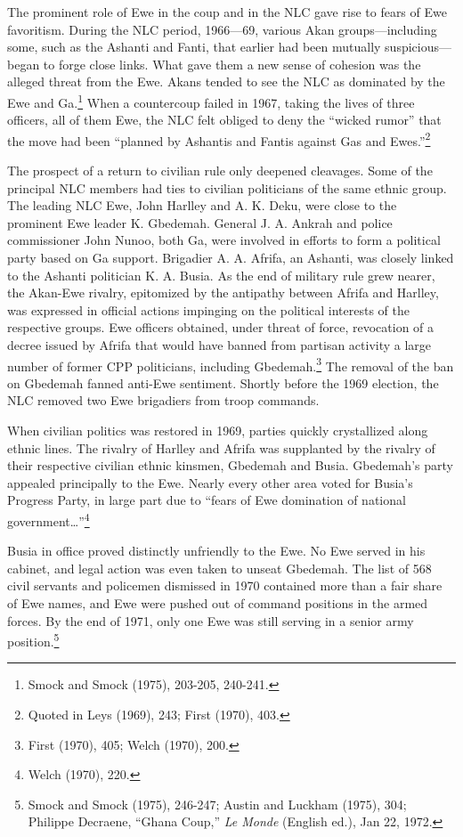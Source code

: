 \documentclass[
  letterpaper,
  DIV=11,
  numbers=noendperiod]{scrartcl}
\begin{document}
The prominent role of Ewe in the coup and in the NLC gave rise to fears
of Ewe favoritism. During the NLC period, 1966---69, various Akan
groups---including some, such as the Ashanti and Fanti, that earlier had
been mutually suspicious---began to forge close links. What gave them a
new sense of cohesion was the alleged threat from the Ewe. Akans tended
to see the NLC as dominated by the Ewe and Ga.\footnote{Smock and Smock
  (1975), 203-205, 240-241.} When a countercoup failed in 1967, taking
the lives of three officers, all of them Ewe, the NLC felt obliged to
deny the ``wicked rumor'' that the move had been ``planned by Ashantis
and Fantis against Gas and Ewes.''\footnote{Quoted in Leys (1969), 243;
  First (1970), 403.}

The prospect of a return to civilian rule only deepened cleavages. Some
of the principal NLC members had ties to civilian politicians of the
same ethnic group. The leading NLC Ewe, John Harlley and A. K. Deku,
were close to the prominent Ewe leader K. Gbedemah. General J. A. Ankrah
and police commissioner John Nunoo, both Ga, were involved in efforts to
form a political party based on Ga support. Brigadier A. A. Afrifa, an
Ashanti, was closely linked to the Ashanti politician K. A. Busia. As
the end of military rule grew nearer, the Akan-Ewe rivalry, epitomized
by the antipathy between Afrifa and Harlley, was expressed in official
actions impinging on the political interests of the respective groups.
Ewe officers obtained, under threat of force, revocation of a decree
issued by Afrifa that would have banned from partisan activity a large
number of former CPP politicians, including Gbedemah.\footnote{First
  (1970), 405; Welch (1970), 200.} The removal of the ban on Gbedemah
fanned anti-Ewe sentiment. Shortly before the 1969 election, the NLC
removed two Ewe brigadiers from troop commands.

When civilian politics was restored in 1969, parties quickly
crystallized along ethnic lines. The rivalry of Harlley and Afrifa was
supplanted by the rivalry of their respective civilian ethnic kinsmen,
Gbedemah and Busia. Gbedemah's party appealed principally to the Ewe.
Nearly every other area voted for Busia's Progress Party, in large part
due to ``fears of Ewe domination of national
government\ldots{}''\footnote{Welch (1970), 220.}

Busia in office proved distinctly unfriendly to the Ewe. No Ewe served
in his cabinet, and legal action was even taken to unseat Gbedemah. The
list of 568 civil servants and policemen dismissed in 1970 contained
more than a fair share of Ewe names, and Ewe were pushed out of command
positions in the armed forces. By the end of 1971, only one Ewe was
still serving in a senior army position.\footnote{Smock and Smock
  (1975), 246-247; Austin and Luckham (1975), 304; Philippe Decraene,
  ``Ghana Coup,'' \emph{Le Monde} (English ed.), Jan 22, 1972.}
\end{document}
